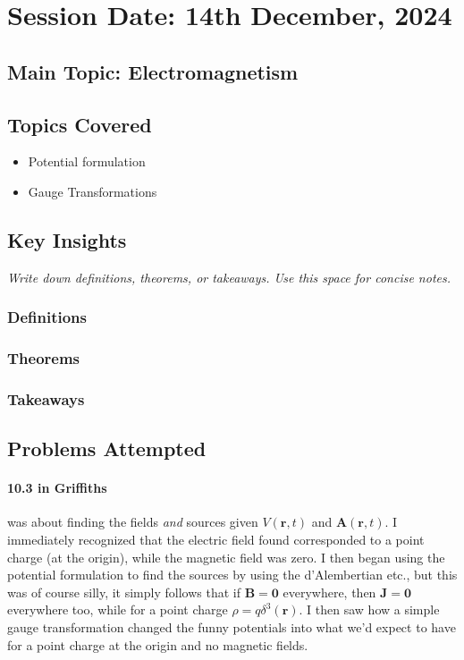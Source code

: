 \section{Session Date: 14th December, 2024}
\subsection*{Main Topic: Electromagnetism}
\subsection*{Topics Covered}
\begin{itemize}
    \item Potential formulation
    \item Gauge Transformations
\end{itemize}

\subsection*{Key Insights}
\textit{Write down definitions, theorems, or takeaways. Use this space for concise notes.}
\subsubsection*{Definitions} 
\subsubsection*{Theorems}
\subsubsection*{Takeaways}

\subsection*{Problems Attempted}
\paragraph{10.3 in Griffiths} was about finding the fields \textit{and} sources given \(V(\mathbf{r}, t)\) and \(\mathbf{A}(\mathbf{r}, t)\). I immediately recognized that the electric field found corresponded to a point charge (at the origin), while the magnetic field was zero. I then began using the potential formulation to find the sources by using the d'Alembertian etc., but this was of course silly, it simply follows that if \(\mathbf{B} = \mathbf{0}\) everywhere, then \(\mathbf{J} = \mathbf{0}\) everywhere too, while for a point charge \(\rho = q \delta ^3 (\mathbf{r})\). I then saw how a simple gauge transformation changed the funny potentials into what we'd expect to have for a point charge at the origin and no magnetic fields.

